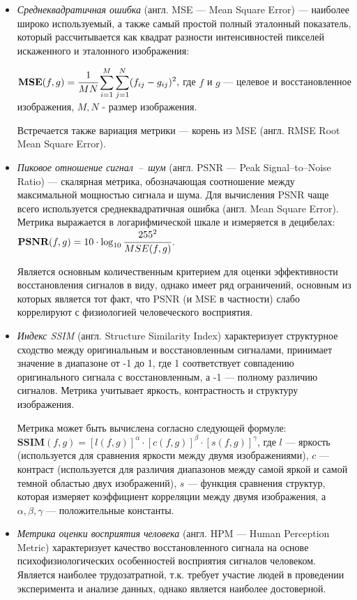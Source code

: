 \begin{itemize}
    \item \textit{Среднеквадратичная ошибка} (англ. MSE --- Mean Square Error) --- наиболее широко используемый, а также самый простой полный эталонный показатель, который рассчитывается как квадрат разности интенсивностей пикселей искаженного и эталонного изображения:

    $\textbf{MSE}(f, g) = \displaystyle\cfrac{1}{MN}\sum_{i=1}^{M}\sum_{j=1}^{N} (f_{ij} - g_{ij}) ^ 2,$ где $f$ и $g$ --- целевое и восстановленное изображения, $M, N$ - размер изображения.
    
    Встречается также вариация метрики --- корень из MSE (англ. RMSE Root Mean Square Error). 
    
    \item \textit{Пиковое отношение сигнал~--~шум} (англ. PSNR --- Peak Signal--to--Noise Ratio) --- скалярная метрика, обозначающая соотношение между максимальной мощностью сигнала и шума. Для вычисления PSNR чаще всего используется среднеквадратичная ошибка (англ. Mean Square Error). Метрика выражается в логарифмической шкале и измеряется в децибелах: $\textbf{PSNR}(f, g) = \displaystyle 10\cdot \log_{10} \cfrac{255^2}{MSE(f, g)}$.
    
    Является основным количественным критерием для оценки эффективности восстановления сигналов в виду, однако имеет ряд ограничений, основным из которых является тот факт, что PSNR (и MSE в частности) слабо коррелируют с физиологией человеческого восприятия.
    
    \item \textit{Индекс SSIM }(англ. Structure Similarity Index) характеризует структурное сходство между оригинальным и восстановленным сигналами, принимает значение в диапазоне от -1 до 1, где 1 соответствует совпадению оригинального сигнала с восстановленным, а -1 --- полному различию сигналов. Метрика учитывает яркость, контрастность и структуру изображения. 
    
    Метрика может быть вычислена согласно следующей формуле: $\textbf{SSIM}(f, g) = [l(f, g)]^\alpha\cdot[c(f, g)]^\beta\cdot[s(f, g)]^\gamma$, где $l$ --- яркость (используется для сравнения яркости между двумя изображениями), $c$ --- контраст (используется для различия диапазонов между самой яркой и самой темной областью двух изображений), $s$ --- функция сравнения структур, которая измеряет коэффициент корреляции между двумя изображения, а $\alpha, \beta, \gamma$ --- положительные константы.

    \item\textit{ Метрика оценки восприятия человека} (англ. HPM --- Human Perception Metric) характеризует качество восстановленного сигнала на основе психофизиологических особенностей восприятия сигналов человеком. Является наиболее трудозатратной, т.к. требует участие людей в проведении эксперимента и анализе данных, однако является наиболее достоверной.
\end{itemize}